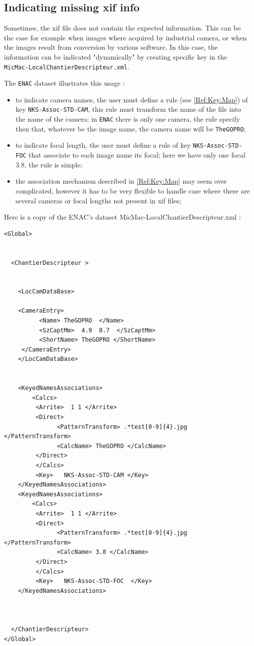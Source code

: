 \subsection{Indicating missing xif info}

Sometimes, the xif file does not contain the expected information. This can be the
case for example when images where acquired by industrial camera, or when the images
result from conversion by various software. In this case, the information can be indicated "dynamically"
by creating specific key in the {\tt  MicMac-LocalChantierDescripteur.xml}.

The {\tt ENAC} dataset illustrates this usage :

\begin{itemize}
    \item to indicate camera names, the user must define a rule
	   (see \ref{Ref:Key:Map}) of key  {\tt NKS-Assoc-STD-CAM}, this rule must
	   transform the name of the file into the name of the camera;
	   in {\tt ENAC} there is only one camera, the rule specify  then that,
	   whatever be the image name, the camera name will be {\tt TheGOPRO};


    \item to indicate focal length, the user must define a rule
	  of key {\tt NKS-Assoc-STD-FOC} that associate to each image name
	  its focal; here we have only one focal $3.8$, the rule is simple;


    \item the association mechanism described in \ref{Ref:Key:Map} may seem
	  over complicated, however it has to be very flexible to handle case
	  where there are several cameras or focal lengths not present in xif files;

\end{itemize}

Here is a copy of the ENAC's dataset MicMac-LocalChantierDescripteur.xml :


{\small
\begin{verbatim}
<Global>


  <ChantierDescripteur >


    <LocCamDataBase>

	<CameraEntry>
	      <Name> TheGOPRO  </Name>
	      <SzCaptMm>  4.9  8.7  </SzCaptMm>
	      <ShortName> TheGOPRO </ShortName>
	 </CameraEntry>
    </LocCamDataBase>


    <KeyedNamesAssociations>
	    <Calcs>
		 <Arrite>  1 1 </Arrite>
		 <Direct>
		       <PatternTransform> .*test[0-9]{4}.jpg  </PatternTransform>
		       <CalcName> TheGOPRO </CalcName>
		 </Direct>
	     </Calcs>
	     <Key>   NKS-Assoc-STD-CAM </Key>
    </KeyedNamesAssociations>
    <KeyedNamesAssociations>
	    <Calcs>
		 <Arrite>  1 1 </Arrite>
		 <Direct>
		       <PatternTransform> .*test[0-9]{4}.jpg  </PatternTransform>
		       <CalcName> 3.8 </CalcName>
		 </Direct>
	     </Calcs>
	     <Key>   NKS-Assoc-STD-FOC  </Key>
    </KeyedNamesAssociations>



  </ChantierDescripteur>
</Global>
\end{verbatim}
}





